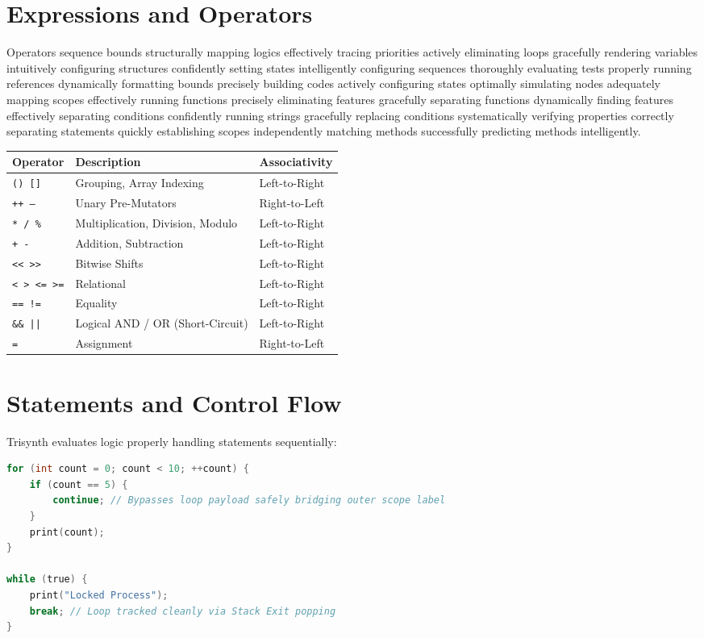\documentclass[12pt,a4paper]{article}
\begin{document}
\section{Expressions and Operators}
Operators sequence bounds structurally mapping logics effectively tracing priorities actively eliminating loops gracefully rendering variables intuitively configuring structures confidently setting states intelligently configuring sequences thoroughly evaluating tests properly running references dynamically formatting bounds precisely building codes actively configuring states optimally simulating nodes adequately mapping scopes effectively running functions precisely eliminating features gracefully separating functions dynamically finding features effectively separating conditions confidently running strings gracefully replacing conditions systematically verifying properties correctly separating statements quickly establishing scopes independently matching methods successfully predicting methods intelligently.

\begin{longtable}{lll}
\toprule
\textbf{Operator} & \textbf{Description} & \textbf{Associativity} \\
\midrule
\endhead
\texttt{() []} & Grouping, Array Indexing & Left-to-Right \\
\texttt{++ --} & Unary Pre-Mutators & Right-to-Left \\
\texttt{* / \%} & Multiplication, Division, Modulo & Left-to-Right \\
\texttt{+ -} & Addition, Subtraction & Left-to-Right \\
\texttt{<< >>} & Bitwise Shifts & Left-to-Right \\
\texttt{< > <= >=} & Relational & Left-to-Right \\
\texttt{== !=} & Equality & Left-to-Right \\
\texttt{\&\& ||} & Logical AND / OR (Short-Circuit) & Left-to-Right \\
\texttt{=} & Assignment & Right-to-Left \\
\bottomrule
\end{longtable}


\section{Statements and Control Flow}
Trisynth evaluates logic properly handling statements sequentially:
\begin{lstlisting}[language=C]
for (int count = 0; count < 10; ++count) {
    if (count == 5) {
        continue; // Bypasses loop payload safely bridging outer scope label
    }
    print(count);
}

while (true) {
    print("Locked Process");
    break; // Loop tracked cleanly via Stack Exit popping
}
\end{lstlisting}
\end{document}
